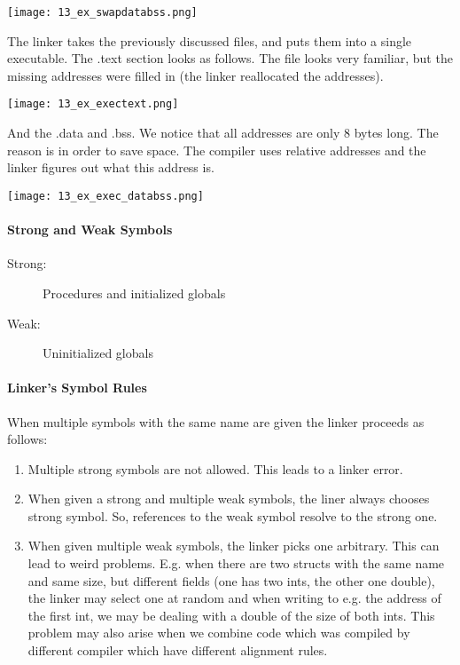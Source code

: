 \texttt{[image: 13\_ex\_swapdatabss.png]}

The linker takes the previously discussed files, and puts them into a single executable. The .text section looks as follows. The file looks very familiar, but the missing addresses were filled in (the linker reallocated the addresses). 

\texttt{[image: 13\_ex\_exectext.png]}

And the .data and .bss. We notice that all addresses are only $8$ bytes long. The reason is in order to save space. The compiler uses relative addresses and the linker figures out what this address is.

\texttt{[image: 13\_ex\_exec\_databss.png]}

\paragraph{Strong and Weak Symbols}
\begin{description}
    \item[Strong:] Procedures and initialized globals
    \item[Weak:] Uninitialized globals
\end{description}

\paragraph{Linker's Symbol Rules}
When multiple symbols with the same name are given the linker proceeds as follows:

\begin{enumerate}
    \item Multiple strong symbols are not allowed. This leads to a linker error.
    \item When given a strong and multiple weak symbols, the liner always chooses strong symbol. So, references to the weak symbol resolve to the strong one.
    \item When given multiple weak symbols, the linker picks one arbitrary. This can lead to weird problems. E.g. when there are two structs with the same name and same size, but different fields (one has two ints, the other one double), the linker may select one at random and when writing to e.g. the address of the first int, we may be dealing with a double of the size of both ints. This problem may also arise when we combine code which was compiled by different compiler which have different alignment rules.
\end{enumerate}


